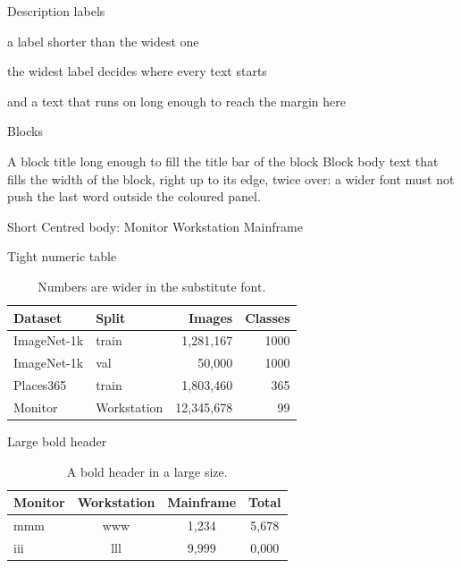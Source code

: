 \documentclass{beamer}
\begin{document}
\begin{frame}[label=description]{Description labels}
  \begin{description}[Workstation]
    \item[Monitor] a label shorter than the widest one
    \item[Workstation] the widest label decides where every text starts
    \item[Mainframe] and a text that runs on long enough to reach the margin here
  \end{description}
\end{frame}

\begin{frame}[label=blocks]{Blocks}
  \begin{block}{A block title long enough to fill the title bar of the block}
    Block body text that fills the width of the block, right up to its edge, twice over:
    a wider font must not push the last word outside the coloured panel.
  \end{block}
  \begin{exampleblock}{Short}
    \centering Centred body: Monitor Workstation Mainframe
  \end{exampleblock}
\end{frame}

\begin{frame}[label=table-tight]{Tight numeric table}
  \begin{table}
    \centering\footnotesize
    \begin{tabular}{@{}llrr@{}}
      \toprule
      Dataset & Split & Images & Classes \\
      \midrule
      ImageNet-1k & train & 1,281,167 & 1000 \\
      ImageNet-1k & val & 50,000 & 1000 \\
      Places365 & train & 1,803,460 & 365 \\
      Monitor & Workstation & 12,345,678 & 99 \\
      \bottomrule
    \end{tabular}
    \caption{Numbers are wider in the substitute font.}
  \end{table}
\end{frame}

\begin{frame}[label=table-header]{Large bold header}
  \begin{table}
    \centering\large
    \begin{tabular}{lccc}
      \toprule
      \textbf{Monitor} & \textbf{Workstation} & \textbf{Mainframe} & \textbf{Total} \\
      \midrule
      mmm & www & 1,234 & 5,678 \\
      iii & lll & 9,999 & 0,000 \\
      \bottomrule
    \end{tabular}
    \caption{A bold header in a large size.}
  \end{table}
\end{frame}
\end{document}
